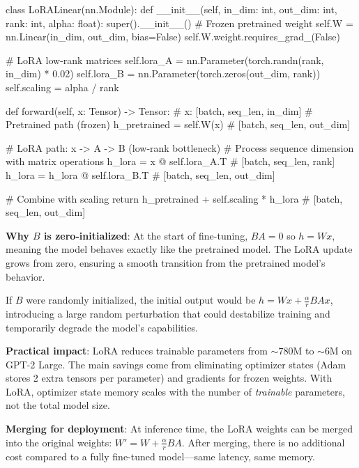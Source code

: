 \begin{pseudocode}
class LoRALinear(nn.Module):
    def __init__(self, in_dim: int, out_dim: int, rank: int, alpha: float):
        super().__init__()
        # Frozen pretrained weight
        self.W = nn.Linear(in_dim, out_dim, bias=False)
        self.W.weight.requires_grad_(False)

        # LoRA low-rank matrices
        self.lora_A = nn.Parameter(torch.randn(rank, in_dim) * 0.02)
        self.lora_B = nn.Parameter(torch.zeros(out_dim, rank))
        self.scaling = alpha / rank

    def forward(self, x: Tensor) -> Tensor:  # x: [batch, seq_len, in_dim]
        # Pretrained path (frozen)
        h_pretrained = self.W(x)              # [batch, seq_len, out_dim]

        # LoRA path: x -> A -> B (low-rank bottleneck)
        # Process sequence dimension with matrix operations
        h_lora = x @ self.lora_A.T             # [batch, seq_len, rank]
        h_lora = h_lora @ self.lora_B.T         # [batch, seq_len, out_dim]

        # Combine with scaling
        return h_pretrained + self.scaling * h_lora  # [batch, seq_len, out_dim]
\end{pseudocode}

\begin{keyconcept}
  \textbf{Why $B$ is zero-initialized}: At the start of fine-tuning,
  $BA = 0$ so $h = Wx$, meaning the model behaves exactly like the
  pretrained model. The LoRA update grows from zero, ensuring a smooth
  transition from the pretrained model's behavior.

  If $B$ were randomly initialized, the initial output would be $h =
  Wx + \frac{\alpha}{r}BAx$, introducing a large random perturbation
  that could destabilize training and temporarily degrade the model's
  capabilities.

  \textbf{Practical impact}: LoRA reduces trainable parameters from
  $\sim$780M to $\sim$6M on GPT-2 Large. The main savings come from
  eliminating optimizer states (Adam stores 2 extra tensors per
  parameter) and gradients for frozen weights. With LoRA, optimizer
  state memory scales with the number of \emph{trainable} parameters,
  not the total model size.

  \textbf{Merging for deployment}: At inference time, the LoRA weights
  can be merged into the original weights: $W' = W + \frac{\alpha}{r}
  BA$. After merging, there is no additional cost compared to a fully
  fine-tuned model---same latency, same memory.
\end{keyconcept}

